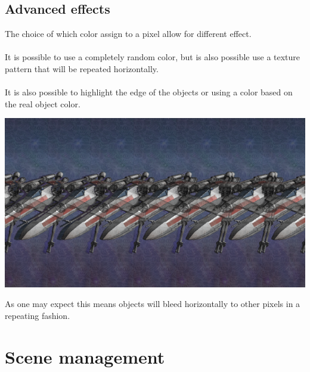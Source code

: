\documentclass[12pt, a4paper]{article}
\begin{document}
\subsection{Advanced effects}
The choice of which color assign to a pixel allow for different effect.\\\\
It is possible to use a completely random color, but is also possible use a texture pattern that will be repeated horizontally.\\\\
It is also possible to highlight the edge of the objects or using a color based on the real object color.
\begin{center}
    \centering
    \includegraphics[width=1.0\textwidth]{img/ship.png}
\end{center}
As one may expect this means objects will bleed horizontally to other pixels in a repeating fashion.
\section{Scene management}
\end{document}
